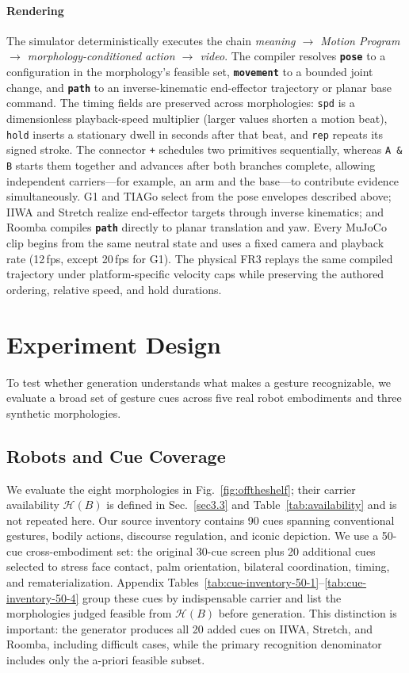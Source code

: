 \documentclass[letterpaper,10pt,conference]{ieeeconf}
\newcommand{\posecolor}[1]{\texttt{\textbf{\textcolor{PoseColor}{#1}}}}
\newcommand{\movecolor}[1]{\texttt{\textbf{\textcolor{MoveColor}{#1}}}}
\newcommand{\pathcolor}[1]{\texttt{\textbf{\textcolor{PathColor}{#1}}}}
\newcommand{\method}{Motion Program}
\begin{document}
\paragraph{Rendering}
\label{sec:rendering}
The simulator deterministically executes the chain \emph{meaning $\rightarrow$ \method{} $\rightarrow$ morphology-conditioned action $\rightarrow$ video}.
The compiler resolves \posecolor{pose} to a configuration in the morphology's feasible set, \movecolor{movement} to a bounded joint change, and \pathcolor{path} to an inverse-kinematic end-effector trajectory or planar base command.
The timing fields are preserved across morphologies: \texttt{spd} is a dimensionless playback-speed multiplier (larger values shorten a motion beat), \texttt{hold} inserts a stationary dwell in seconds after that beat, and \texttt{rep} repeats its signed stroke.
The connector \texttt{+} schedules two primitives sequentially, whereas \texttt{A \& B} starts them together and advances after both branches complete, allowing independent carriers---for example, an arm and the base---to contribute evidence simultaneously.
G1 and TIAGo select from the pose envelopes described above; IIWA and Stretch realize end-effector targets through inverse kinematics; and Roomba compiles \pathcolor{path} directly to planar translation and yaw.
Every MuJoCo clip begins from the same neutral state and uses a fixed camera and playback rate (12\,fps, except 20\,fps for G1).
The physical FR3 replays the same compiled trajectory under platform-specific velocity caps while preserving the authored ordering, relative speed, and hold durations.


\section{Experiment Design}
\label{sec:experiment}
To test whether generation understands what makes a gesture recognizable, we evaluate a broad set of gesture cues across five real robot embodiments and three synthetic morphologies.

\subsection{Robots and Cue Coverage}
We evaluate the eight morphologies in Fig.~\ref{fig:offtheshelf}; their carrier availability $\mathcal{H}(B)$ is defined in Sec.~\ref{sec3.3} and Table~\ref{tab:availability} and is not repeated here.
Our source inventory contains 90 cues spanning conventional gestures, bodily actions, discourse regulation, and iconic depiction. We use a 50-cue cross-embodiment set: the original 30-cue screen plus 20 additional cues selected to stress face contact, palm orientation, bilateral coordination, timing, and rematerialization. Appendix Tables~\ref{tab:cue-inventory-50-1}--\ref{tab:cue-inventory-50-4} group these cues by indispensable carrier and list the morphologies judged feasible from $\mathcal{H}(B)$ before generation. This distinction is important: the generator produces all 20 added cues on IIWA, Stretch, and Roomba, including difficult cases, while the primary recognition denominator includes only the a-priori feasible subset.
\end{document}
